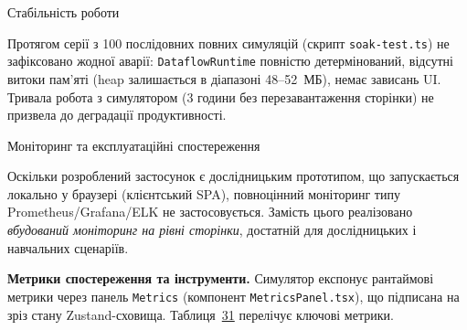 Стабільність роботи

Протягом серії з 100 послідовних повних симуляцій (скрипт
\texttt{soak-test.ts}) не зафіксовано жодної аварії:
\texttt{DataflowRuntime} повністю детермінований, відсутні витоки
пам'яті (heap залишається в діапазоні 48--52~МБ), немає зависань UI.
Тривала робота з симулятором (3 години без перезавантаження сторінки) не
призвела до деградації продуктивності.

\protect{}\label{_Toc229681187}{}Моніторинг та
експлуатаційні спостереження

Оскільки розроблений застосунок є дослідницьким прототипом, що
запускається локально у браузері (клієнтський SPA), повноцінний
моніторинг типу Prometheus/Grafana/ELK не застосовується. Замість цього
реалізовано \emph{вбудований моніторинг на рівні сторінки}, достатній
для дослідницьких і навчальних сценаріїв.

\textbf{Метрики спостереження та інструменти.} Симулятор експонує
рантаймові метрики через панель \texttt{Metrics} (компонент
\texttt{MetricsPanel.tsx}), що підписана на зріз стану Zustand-сховища.
Таблиця~\hyperref[tab:monitoring_metrics]{31} перелічує ключові метрики.

